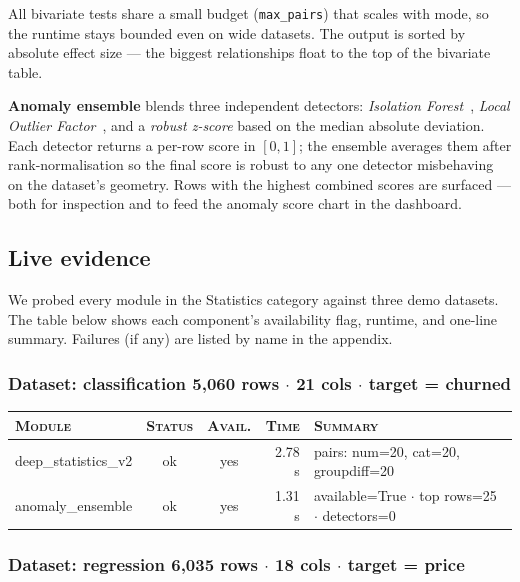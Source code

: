 \documentclass[11pt,a4paper]{article}
\begin{document}
All bivariate tests share a small budget (\texttt{max\_pairs}) that scales with mode, so the runtime stays bounded even on wide datasets. The output is sorted by absolute effect size --- the biggest relationships float to the top of the bivariate table.

\textbf{Anomaly ensemble} blends three independent detectors: \textit{Isolation Forest}~\cite{liu2008isoforest}, \textit{Local Outlier Factor}~\cite{breunig2000lof}, and a \textit{robust z-score} based on the median absolute deviation. Each detector returns a per-row score in $[0, 1]$; the ensemble averages them after rank-normalisation so the final score is robust to any one detector misbehaving on the dataset's geometry. Rows with the highest combined scores are surfaced --- both for inspection and to feed the anomaly score chart in the dashboard.

\subsection{Live evidence}

We probed every module in the Statistics category against three
demo datasets. The table below shows each component's availability flag,
runtime, and one-line summary. Failures (if any) are listed by name in the
appendix.


\subsubsection*{Dataset: classification
\hfill {\color{ink3}\footnotesize 5,060 rows
{$\boldsymbol{\cdot}$} 21 cols
{$\boldsymbol{\cdot}$} target = churned}}

\begin{tabularx}{\linewidth}{l c c r X}
\toprule
\textsc{Module} & \textsc{Status} & \textsc{Avail.} & \textsc{Time} & \textsc{Summary} \\
\midrule
deep\_statistics\_v2 & \textcolor{ok}{ok} & \textcolor{ok}{yes} & 2.78 s & pairs: num=20, cat=20, groupdiff=20 \\
anomaly\_ensemble & \textcolor{ok}{ok} & \textcolor{ok}{yes} & 1.31 s & available=True $\cdot$ top rows=25 $\cdot$ detectors=0 \\
\bottomrule
\end{tabularx}


\subsubsection*{Dataset: regression
\hfill {\color{ink3}\footnotesize 6,035 rows
{$\boldsymbol{\cdot}$} 18 cols
{$\boldsymbol{\cdot}$} target = price}}
\end{document}
